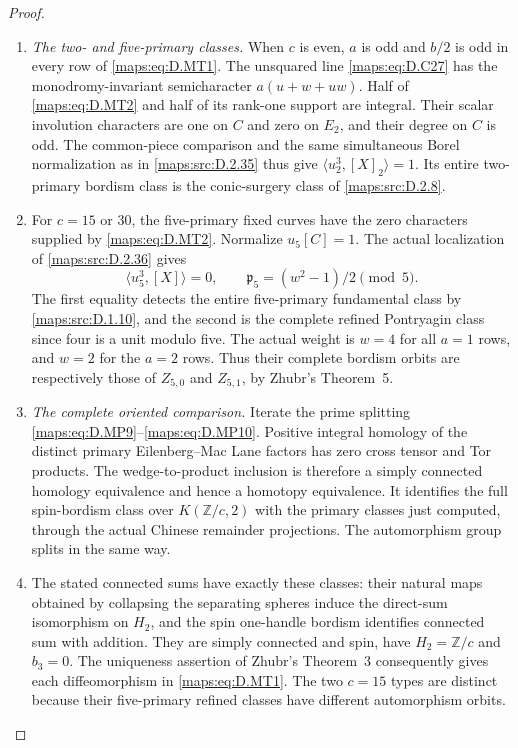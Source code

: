 \begin{proof}
\begin{enumerate}[label=\arabic*.,leftmargin=*]
\item \emph{The two- and five-primary classes.}
When $c$ is even, $a$ is odd and $b/2$ is odd in every
row of \eqref{maps:eq:D.MT1}. The unsquared line \eqref{maps:eq:D.C27} has the
monodromy-invariant semicharacter $a(u+w+uw)$.
Half of \eqref{maps:eq:D.MT2} and half of its rank-one support are
integral. Their scalar involution characters are one
on $C$ and zero on $E_2$, and their degree on $C$ is odd.
The common-piece comparison and the same simultaneous
Borel normalization as in \ref{maps:src:D.2.35} thus give
$\langle u_2^3,[X]_2\rangle=1$. Its entire two-primary
bordism class is the conic-surgery class of \ref{maps:src:D.2.8}.

\item For $c=15$ or $30$, the five-primary fixed curves have
the zero characters supplied by \eqref{maps:eq:D.MT2}. Normalize
$u_5[C]=1$. The actual localization of \ref{maps:src:D.2.36} gives
\[
 \langle u_5^3,[X]\rangle=0,\qquad
 \mathfrak p_5=(w^2-1)/2\pmod5.                           \tag{D.MT3}\label{maps:eq:D.MT3}
\]
The first equality detects the entire five-primary
fundamental class by \ref{maps:src:D.1.10}, and the second is the
complete refined Pontryagin class since four is a
unit modulo five. The actual weight is $w=4$ for
all $a=1$ rows, and $w=2$ for the $a=2$ rows.
Thus their complete bordism orbits are respectively
those of $Z_{5,0}$ and $Z_{5,1}$, by Zhubr's Theorem~5.

\item \emph{The complete oriented comparison.}
Iterate the prime splitting \eqref{maps:eq:D.MP9}--\eqref{maps:eq:D.MP10}.
Positive integral homology of the distinct primary
Eilenberg--Mac Lane factors has zero cross tensor and
Tor products. The wedge-to-product inclusion is therefore
a simply connected homology equivalence and hence a
homotopy equivalence. It identifies the full spin-bordism
class over $K(\mathbb Z/c,2)$ with the primary classes
just computed, through the actual Chinese remainder
projections. The automorphism group splits in the same way.

\item The stated connected sums have exactly these classes:
their natural maps obtained by collapsing the separating
spheres induce the direct-sum isomorphism on $H_2$, and
the spin one-handle bordism identifies connected sum
with addition. They are simply connected and spin, have
$H_2=\mathbb Z/c$ and $b_3=0$. The uniqueness assertion
of Zhubr's Theorem~3 \cite[p.795]{manZhubr75} consequently
gives each diffeomorphism in \eqref{maps:eq:D.MT1}. The two $c=15$
types are distinct because their five-primary refined
classes have different automorphism orbits.
\end{enumerate}
\end{proof}

